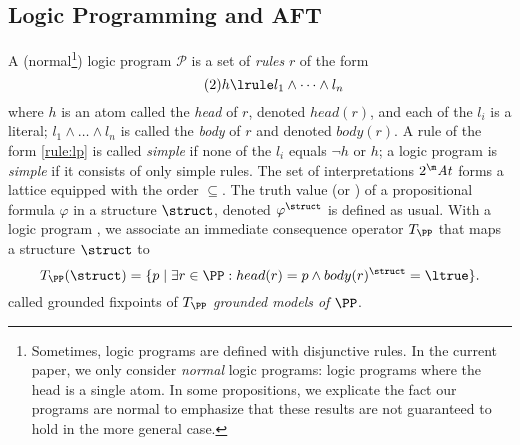 

\subsection{Logic Programming and AFT}
\renewcommand\voc\atoms
A (normal\footnote{Sometimes, logic programs are defined with disjunctive rules. In the current paper, we only consider \emph{normal} logic programs: logic programs where the head is a single atom. In some propositions, we explicate the fact our programs are normal to emphasize that these results are not guaranteed to hold in the more general case.}) logic program $\mathcal{P}$ is a set of \emph{rules} $r$ of the form 
\begin{equation}
 \tag{2}h\lrule l_1\land \dots \land l_n \label{rule:lp}
\end{equation}
where
$h$ is an atom called the \emph{head} of $r$, denoted $head(r)$, and each of the $l_i$ is a literal; $ l_1\land \dots \land l_n$ is called  the \emph{body} of $r$ and denoted $body(r)$.
A rule of the form \eqref{rule:lp} is called \emph{simple} if none of the $l_i$ equals $\lnot h$ or $h$; a logic program is \emph{simple} if it consists of only simple rules.
The set of interpretations $2^\voc$ forms a lattice equipped with the order $\subseteq$. 
The truth value (\ltrue or \lfalse) of a propositional formula $\varphi$ in a structure $\struct$, denoted $\varphi^\struct$ is defined as usual.
With a logic program \PP, we associate an immediate consequence operator \cite{jacm/EmdenK76} $T_\PP$ that maps a structure $\struct$ to 
	\[T_\PP(\struct) = \{p\mid \exists r \in \PP: head(r)=p\land body(r)^\struct=\ltrue\}.\] 
	 called grounded fixpoints of $T_\PP$ \emph{grounded models of $\PP$}. 
	
